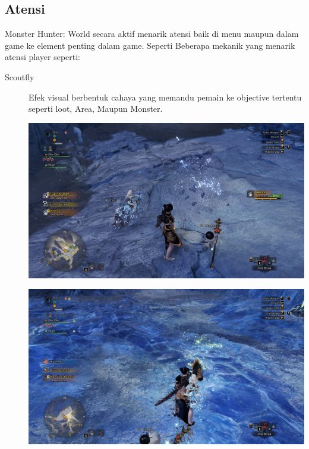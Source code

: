 \documentclass[12pt]{article}
\begin{document}
\subsection{Atensi}
Monster Hunter: World secara aktif menarik atensi baik di menu maupun dalam game ke element penting dalam game.
Seperti Beberapa mekanik yang menarik atensi player seperti:
\begin{description}
    \item[Scoutfly] Efek visual berbentuk cahaya yang memandu pemain ke objective tertentu seperti loot, Area, Maupun Monster.
    \begin{center}
        \begin{minipage}{0.45\textwidth}
            \centering
            \includegraphics[width=\textwidth]{Image/Blue_Scoutfly.png}
        \end{minipage}
        \hfill
        \begin{minipage}{0.45\textwidth}
            \centering
            \includegraphics[width=\textwidth]{Image/Green_Scoutfly.png}

\end{minipage}
\end{center}
\end{description}
\end{document}
